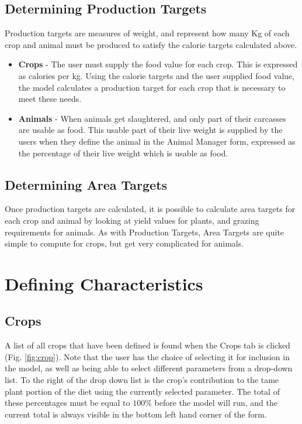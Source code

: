  \subsection{Determining Production Targets}
    Production targets are measures of weight, and represent how many Kg of each
    crop and animal must be produced to satisfy the calorie targets calculated
    above.
  \begin{itemize}
    \item \textbf{Crops} - The user must supply the food value for each crop. 
      This is expressed as calories per kg.  Using the calorie targets and the
      user supplied food value, the model calculates a production target for each
      crop that is necessary to meet these needs.
    \item \textbf{Animals} - When animals get slaughtered, and only part of
      their carcasses are usable as food.  This usable part of their live weight
      is supplied by the users when they define the animal in the Animal Manager
      form, expressed as the percentage of their live weight which is usable as food.
  \end{itemize}

  \subsection{Determining Area Targets}
  Once production targets are calculated, it is possible to calculate area
  targets for each crop and animal by looking at yield values for plants, and
  grazing requirements for animals.  As with Production Targets, Area Targets
  are quite simple to compute for crops, but get very complicated for animals.

\section{Defining Characteristics}
 \subsection{Crops}
    A list of all crops that have been defined is found when the Crops tab is
    clicked (Fig. \ref{fig:crop}).  Note that the user has the choice of
    selecting it for inclusion in the model, as well as being able to select
    different parameters from a drop-down list.  To the right of the drop down
    list is the crop's contribution to the tame plant portion of the diet using
    the currently selected parameter.  The total of these percentages must be
    equal to $100\%$ before the model will run, and the current total is always
    visible in the bottom left hand corner of the form.

